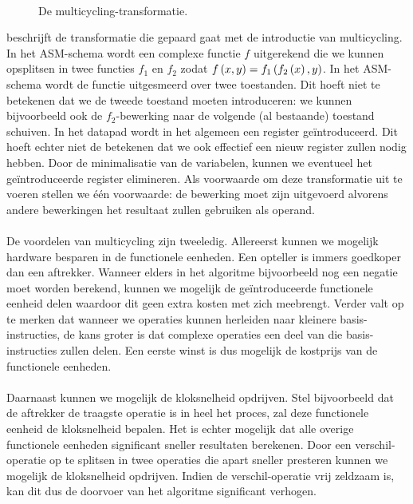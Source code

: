 \paragraph{}
\begin{figure}[hbt]
\centering
{}
\caption{De multicycling-transformatie.}
\end{figure}
 beschrijft de transformatie die gepaard gaat met de introductie van multicycling. In het ASM-schema wordt een complexe functie $f$ uitgerekend die we kunnen opsplitsen in twee functies $f_1$ en $f_2$ zodat $f\left( x,y \right)=f_1\left( f_2\left( x \right),y \right)$. In het ASM-schema wordt de functie uitgesmeerd over twee toestanden. Dit hoeft niet te betekenen dat we de tweede toestand moeten introduceren: we kunnen bijvoorbeeld ook de $f_2$-bewerking naar de volgende (al bestaande) toestand schuiven. In het datapad wordt in het algemeen een register ge\"introduceerd. Dit hoeft echter niet de betekenen dat we ook effectief een nieuw register zullen nodig hebben. Door de minimalisatie van de variabelen, kunnen we eventueel het ge\"introduceerde register elimineren. Als voorwaarde om deze transformatie uit te voeren stellen we \'e\'en voorwaarde: de bewerking moet zijn uitgevoerd alvorens andere bewerkingen het resultaat zullen gebruiken als operand.
\paragraph{}
De voordelen van multicycling zijn tweeledig. Allereerst kunnen we mogelijk hardware besparen in de functionele eenheden. Een opteller is immers goedkoper dan een aftrekker. Wanneer elders in het algoritme bijvoorbeeld nog een negatie moet worden berekend, kunnen we mogelijk de ge\"introduceerde functionele eenheid delen waardoor dit geen extra kosten met zich meebrengt. Verder valt op te merken dat wanneer we operaties kunnen herleiden naar kleinere basis-instructies, de kans groter is dat complexe operaties een deel van die basis-instructies zullen delen. Een eerste winst is dus mogelijk de kostprijs van de functionele eenheden.
\paragraph{}
Daarnaast kunnen we mogelijk de kloksnelheid opdrijven. Stel bijvoorbeeld dat de aftrekker de traagste operatie is in heel het proces, zal deze functionele eenheid de kloksnelheid bepalen. Het is echter mogelijk dat alle overige functionele eenheden significant sneller resultaten berekenen. Door een verschil-operatie op te splitsen in twee operaties die apart sneller presteren kunnen we mogelijk de kloksnelheid opdrijven. Indien de verschil-operatie vrij zeldzaam is, kan dit dus de doorvoer van het algoritme significant verhogen.
